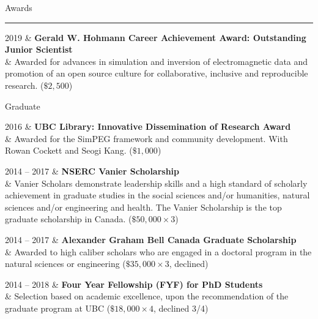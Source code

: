 \documentclass[a4paper, 11pt]{article}
\newcommand{\heading}[1]{
    \begin{minipage}[t]{\textwidth}
    \vspace{0.1cm}
    {\LARGE #1}\\
    \vspace{-0.24cm}
    \hrule
    \end{minipage}
    \vspace{0.05cm}

}
\newcommand{\subheading}[1]{
    \vspace{0.4cm}
    {\Large #1}\\
    \vspace{-0.2cm}
}
\begin{document}


\heading{Awards}

\begin{entryright}
2019 & \textbf{Gerald W. Hohmann Career Achievement Award: Outstanding Junior Scientist} \\
& Awarded for advances in simulation and inversion of electromagnetic data and promotion of an open source culture for collaborative, inclusive and reproducible research. ($\$2,500$)
\end{entryright}

\subheading{Graduate}
\begin{entryright}
2016 & \textbf{UBC Library: Innovative Dissemination of Research Award}   \\
& Awarded for the SimPEG framework and community development. With Rowan Cockett and Seogi Kang. ($\$1,000$)
\end{entryright}

\begin{entryright}
2014 -- 2017 & \textbf{NSERC Vanier Scholarship} \\
& Vanier Scholars demonstrate leadership skills and a high standard of scholarly achievement in graduate studies in the social sciences and/or humanities, natural sciences and/or engineering and health. The Vanier Scholarship is the top graduate scholarship in Canada. ($ \$50,000 \times 3$)
\end{entryright}

\begin{entryright}
2014 -- 2017 & \textbf{Alexander Graham Bell Canada Graduate Scholarship} \\
& Awarded to high caliber scholars who are engaged in a doctoral program in the natural sciences or engineering ($ \$35,000 \times 3$, declined)
\end{entryright}

\begin{entryright}
2014 -- 2018 & \textbf{Four Year Fellowship (FYF) for PhD Students} \\
& Selection based on academic excellence, upon the recommendation of the graduate program at UBC ($\$18,000 \times 4$, declined 3/4)
\end{entryright}
\end{document}
